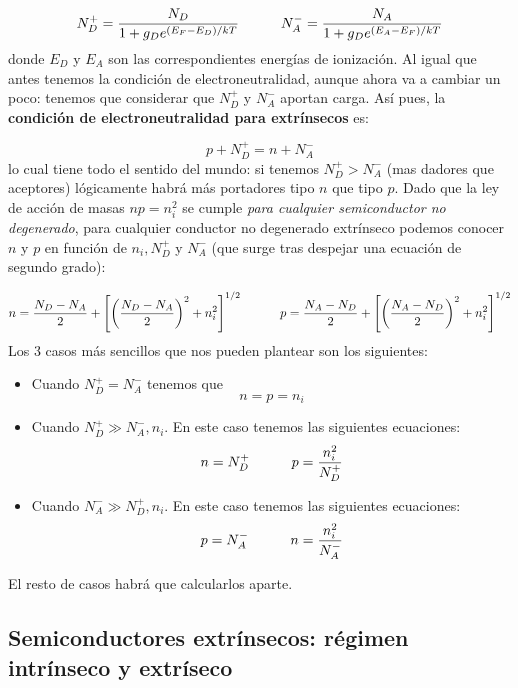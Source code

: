 \begin{equation}
	N_D^+ = \frac{N_D}{1+g_D e^{(E_F-E_D)/kT}} \quad \quad \quad
	N_A^- = \frac{N_A}{1+g_D e^{(E_A-E_F)/kT}} 
\end{equation}
donde $E_D$ y $E_A$ son las correspondientes energías de ionización. Al igual que antes tenemos la condición de electroneutralidad, aunque ahora va a cambiar un poco: tenemos que considerar que $N_D^+$ y $N_A^-$ aportan carga. Así pues, la \textbf{condición de electroneutralidad para extrínsecos} es:

\begin{equation}
	p + N_D^+ = n + N_A^-
\end{equation}
lo cual tiene todo el sentido del mundo: si tenemos $N_D^+>N_A^-$ (mas dadores que aceptores) lógicamente habrá más portadores tipo $n$ que tipo $p$. Dado que la ley de acción de masas $np=n_i^2$ se cumple \textit{para cualquier semiconductor no degenerado}, para cualquier conductor no degenerado extrínseco podemos conocer $n$ y $p$ en función de $n_i,N_D^+$ y $N_A^-$ (que surge tras despejar una ecuación de segundo grado):

\begin{equation}
	n = \frac{N_D-N_A}{2} + \left[ \left( \frac{N_D-N_A}{2} \right)^2 + n_i^2 \right]^{1/2} \quad \quad \quad p = \frac{N_A-N_D}{2} + \left[ \left( \frac{N_A-N_D}{2} \right)^2 + n_i^2 \right]^{1/2}
\end{equation}
Los 3 casos más sencillos que nos pueden plantear son los siguientes:

\begin{itemize}
	\item Cuando $N_D^+=N_A^-$ tenemos que
	 \begin{equation}
		n=p=n_i
	\end{equation}
	\item Cuando $N_D^+ \gg N_A^-,n_i$. En este caso tenemos las siguientes ecuaciones:
	\begin{equation}
		n=N_D^+ \quad \quad \quad p = \frac{n_i^2}{N_D^+}
	\end{equation}
	\item Cuando $N_A^-\gg N_D^+,n_i$. En este caso tenemos las siguientes ecuaciones:
	\begin{equation}
		p=N_A^- \quad \quad \quad n = \frac{n_i^2}{N_A^-}
	\end{equation}
\end{itemize}
El resto de casos habrá que calcularlos aparte. 

\subsection{Semiconductores extrínsecos: régimen intrínseco y extríseco}

